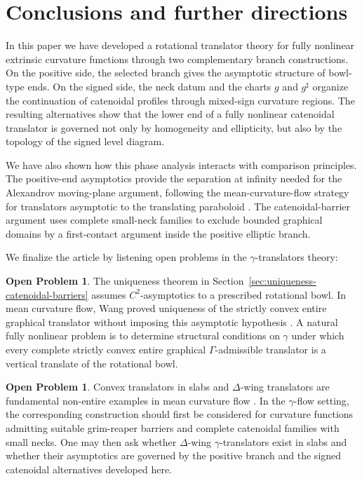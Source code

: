 \documentclass{amsart}
\theoremstyle{plain}
\theoremstyle{mainintrothm}
\theoremstyle{definition}
\newtheorem{op}[theorem]{Open Problem}
\begin{document}
	
	
\section{Conclusions and further directions}
\label{sec:conclusions}

In this paper we have developed a rotational translator theory for fully
nonlinear extrinsic curvature functions through two complementary branch
constructions.  On the positive side, the selected branch gives the asymptotic
structure of bowl-type ends.  On the signed side, the neck datum and the charts
$g$ and $g^\sharp$ organize the continuation of catenoidal profiles through
mixed-sign curvature regions.  The resulting alternatives show that the lower
end of a fully nonlinear catenoidal translator is governed not only by
homogeneity and ellipticity, but also by the topology of the signed level
diagram.

\medskip

We have also shown how this phase analysis interacts with comparison
principles.  The positive-end asymptotics provide the separation at infinity
needed for the Alexandrov moving-plane argument, following the
mean-curvature-flow strategy for translators asymptotic to the translating
paraboloid \cite{Paco_2014}.  The catenoidal-barrier argument uses complete
small-neck families to exclude bounded graphical domains by a first-contact
argument inside the positive elliptic branch.

\medskip

We finalize the article by listening open problems in the $\gamma$-translators theory:

\begin{op}
	The uniqueness theorem in
	Section~\ref{sec:uniqueness-catenoidal-barriers} assumes $C^2$-asymptotics to
	a prescribed rotational bowl.  In mean curvature flow, Wang proved uniqueness
	of the strictly convex entire graphical translator without imposing this
	asymptotic hypothesis \cite{wang2011convex}.  A natural fully nonlinear problem
	is to determine structural conditions on $\gamma$ under which every complete
	strictly convex entire graphical $\Gamma$-admissible translator is a vertical
	translate of the rotational bowl.
\end{op}

\begin{op}
	Convex translators in slabs and $\Delta$-wing translators are fundamental
	non-entire examples in mean curvature flow
	\cite{wang2011convex,bourni2020existence,HMWS-deltawings}.  In the
	$\gamma$-flow setting, the corresponding construction should first be
	considered for curvature functions admitting suitable grim-reaper barriers and
	complete catenoidal families with small necks.  One may then ask whether
	$\Delta$-wing $\gamma$-translators exist in slabs and whether their asymptotics
	are governed by the positive branch and the signed catenoidal alternatives
	developed here.
\end{op}
\end{document}

